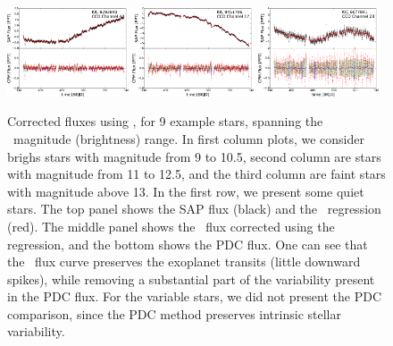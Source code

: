 \begin{figure}[p]
\begin{center}
\includegraphics[width=0.32\textwidth]{figures/cpm/f5g}
\hfill
\includegraphics[width=0.32\textwidth]{figures/cpm/f5h}
\hfill
\includegraphics[width=0.32\textwidth]{figures/cpm/f5i}
\end{center}

\caption[The \name photometry for example stars]{
  \label{fluxes} 
  Corrected fluxes using \name, for 9 example stars, spanning the \Kepler\ magnitude (brightness) range. 
  In first column plots, we consider brighs stars with magnitude from 9 to 10.5, second column are stars with magnitude from 11 to 12.5, and the third column are faint stars with magnitude above 13. 
  In the first row, we present some quiet stars. 
  The top panel shows the SAP flux (black) and the \name\ regression (red). 
  The middle panel shows the \name\ flux corrected using the regression, and the bottom shows the PDC flux. 
  One can see that the \name\ flux curve preserves the exoplanet transits (little downward spikes), while removing a substantial part of the variability present in the PDC flux.  
  For the variable stars, we did not present the PDC comparison, since the PDC method preserves intrinsic stellar variability.
}
\end{figure}

